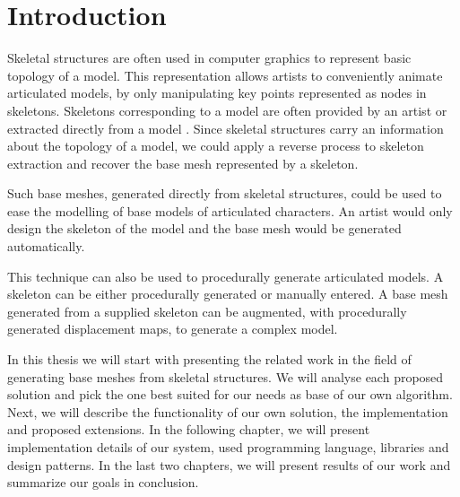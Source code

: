 \chapter*{Introduction}

Skeletal structures are often used in computer graphics to represent basic topology of a model.
This representation allows artists to conveniently animate articulated models, by only manipulating key points represented as nodes in skeletons.
Skeletons corresponding to a model are often provided by an artist or extracted directly from a model \cite{laplac}.
Since skeletal structures carry an information about the topology of  a model, we could apply a reverse process to skeleton extraction and recover the base mesh represented by a skeleton.

Such base meshes, generated directly from skeletal structures, could be used to ease the modelling of base models of articulated characters.
An artist would only design the skeleton of the model and the base mesh would be generated automatically.

This technique can also be used to procedurally generate articulated models.
A skeleton can be either procedurally generated or manually entered.
A base mesh generated from a supplied skeleton can be augmented, with procedurally generated displacement maps, to generate a complex model.

In this thesis we will start with presenting the related work in the field of generating base meshes from skeletal structures.
We will analyse each proposed solution and pick the one best suited for our needs as base of our own algorithm.
Next, we will describe the functionality of our own solution, the implementation and proposed extensions.
In the following chapter, we will present implementation details of our system, used programming language, libraries and design patterns.
In the last two chapters, we will present results of our work and summarize our goals in conclusion.